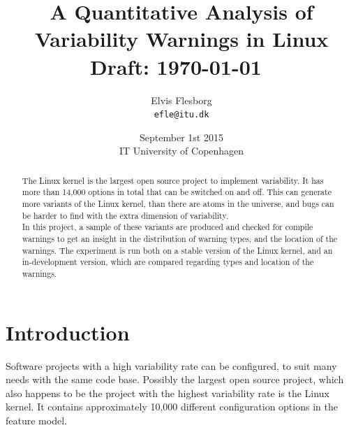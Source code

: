 \documentclass[a4paper,11pt]{report}
\begin{document}
\setlength{\parindent}{0cm}
\setlength{\unitlength}{1mm}

\date{September 1st 2015\\ IT University of Copenhagen}
\title{A Quantitative Analysis of Variability Warnings in Linux \\ Draft: 
    \today~\currenttime}
\author{Elvis Flesborg\\
\texttt{efle@itu.dk}}
\clearpage\maketitle
\thispagestyle{empty}
\newpage

\tableofcontents
\thispagestyle{empty}



\newpage

\setcounter{page}{1}


            \begin{abstract}

The Linux kernel is the largest open source project to implement variability. It
has more than 14,000 options in total that can be switched on and off. This can 
generate more variants of the Linux kernel, than there are atoms in the 
universe, and bugs can be harder to find with the extra dimension of 
variability.
\\

In this project, a sample of these variants are produced and checked for compile
warnings to get an insight in the distribution of warning types, and the 
location of the warnings. The experiment is run both on a stable version of the 
Linux kernel, and an in-development version, which are compared regarding types 
and location of the warnings.



            \end{abstract}


\chapter{Introduction}
Software projects with a high variability rate can be configured, to suit many
needs with the same code base. Possibly the largest open source project, which 
also happens to be the project with the highest variability rate
is the Linux kernel. It contains approximately 10,000 different configuration 
options in the feature model.
\\
\end{document}
